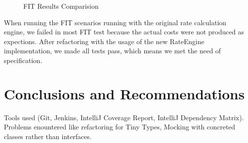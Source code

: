 \documentclass[a4paper,12pt,oneside,final]{article}
\newenvironment{changemargin}[2]{\begin{list}{}{%
\setlength{\topsep}{0pt}%
\setlength{\leftmargin}{0pt}%
\setlength{\rightmargin}{0pt}%
\setlength{\listparindent}{\parindent}%
\setlength{\itemindent}{\parindent}%
\setlength{\parsep}{0pt plus 1pt}%
\addtolength{\leftmargin}{#1}%
\addtolength{\rightmargin}{#2}%
}\item }{\end{list}}
\begin{document}
\begin{figure}
\centering
\mbox{}
\caption{FIT Results Comparision}
\end{figure}

When running the FIT scenarios running with the original rate calculation engine, we failed in most FIT test because the actual costs were not produced as expections. After refactoring with the usage of the new RateEngine implementation, we made all tests pass, which means we met the need of  specification. 




\section{Conclusions and Recommendations} %
\paragraph{}
Tools used (Git, Jenkins, IntelliJ Coverage Report, IntelliJ Dependency Matrix).  Problems enountered like refactoring for Tiny Types, Mocking with concreted classes rather than interfaces.
\end{document}
